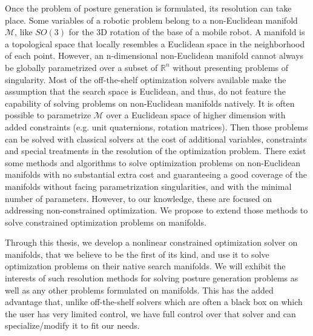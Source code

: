 Once the problem of posture generation is formulated, its resolution can take place.
Some variables of a robotic problem belong to a non-Euclidean manifold $\mathcal{M}$, like $SO(3)$ for the 3D rotation of the base of a mobile robot.
A manifold is a topological space that locally resembles a Euclidean space in the neighborhood of each point.
However, an n-dimensional non-Euclidean manifold cannot always be globally parametrized over a subset of $\mathbb{R}^n$ without presenting problems of singularity.
Most of the off-the-shelf optimization solvers available make the assumption that the search space is Euclidean, and thus, do not feature the capability of solving problems on non-Euclidean manifolds natively.
It is often possible to parametrize $\mathcal{M}$ over a Euclidean space of higher dimension with added constraints (e.g. unit quaternions, rotation matrices).
Then those problems can be solved with classical solvers at the cost of additional variables, constraints and special treatments in the resolution of the optimization problem.
There exist some methods and algorithms to solve optimization problems on non-Euclidean manifolds with no substantial extra cost and guaranteeing a good coverage of the manifolds without facing parametrization singularities, and with the minimal number of parameters.
However, to our knowledge, these are focused on addressing non-constrained optimization.
We propose to extend those methods to solve constrained optimization problems on manifolds.

Through this thesis, we develop a nonlinear constrained optimization solver on manifolds, that we believe to be the first of its kind, and use it to solve optimization problems on their native search manifolds.
We will exhibit the interests of such resolution methods for solving posture generation problems as well as any other problems formulated on manifolds.
This has the added advantage that, unlike off-the-shelf solvers which are often a black box on which the user has very limited control, we have full control over that solver and can specialize/modify it to fit our needs.


